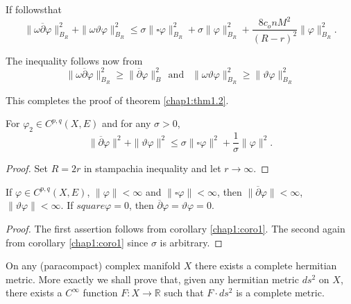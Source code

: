 If follows\pageoriginale that
$$
\| \omega \overline{\partial}\varphi \|^2 _{B_R} + \|\omega \vartheta
\varphi \|^2_{B_R} \leq \sigma \|\square \varphi \|^2_{B_R} +
\sigma \|\varphi \|^2_{B_R}+ \frac{8c_onM^2}{(R-r)^2}\|\varphi
\|^2_{B_R}.
$$

The inequality follows now from
$$
\|\omega \overline{\partial} \varphi \|^2_{B_R} \geqslant \|
\overline{\partial}\varphi \|^2 _B ~~\text{and }~~\| \omega \vartheta
\varphi \|^2 _{B_R} \geqslant \|\vartheta \varphi \|^2 _{B_R}
$$

This completes the proof of theorem \ref{chap1:thm1.2}.

\begin{corollary}\label{chap1:coro1}%
  For $\varphi_2 \in C^{p,q}(X,E)$ and for any $\sigma > 0$,
  $$ 
  \|\overline {\partial} \varphi \|^2  + \|\vartheta \varphi \|^2 \leq
  \sigma \| \square \varphi \|^2 + \frac{1}{\sigma} \| \varphi \|^2.
  $$
\end{corollary}

\begin{proof}
  Set $R=2r$ in stampachia inequality and let $r \rightarrow \infty $.
\end{proof}

\begin{corollary}\label{chap1:coro2}%
  If $\varphi \in C^{p,q}(X, E)$, $\|\varphi\|<\infty $ and $\|\square
  \varphi \| <\infty$, then 
  $\| \overline{\partial}\varphi\|<\infty$, $\|\vartheta \varphi \|
  <\infty$. If $square \varphi =0$, then
  $\overline{\partial}\varphi = \vartheta \varphi=0 $. 
\end{corollary}

\begin{proof}
  The first assertion follows from corollary \ref{chap1:coro1}. The second
  again from corollary \ref{chap1:coro1} since $\sigma$ is arbitrary.
\end{proof}

\begin{remark*}
  On any (paracompact) complex manifold $X$ there exists a
  complete hermitian metric. More exactly we shall prove that, given
  any hermitian metric $ds^2$ on $X$, there exists a $C^\infty$ function
  $F:X\rightarrow \mathbb{R}$ such that $F \cdot ds^2$ is a complete metric. 
\end{remark*}

